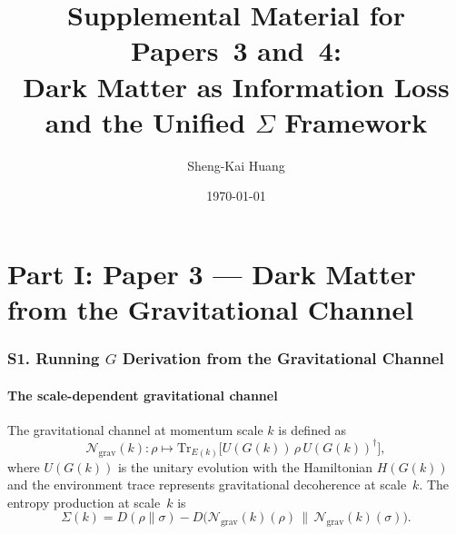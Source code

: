 \documentclass[aps,prd,preprint,superscriptaddress,longbibliography]{revtex4-2}
\newcommand{\Tr}{\mathrm{Tr}}
\newcommand{\chan}{\mathcal{N}}
\newcommand{\KL}{D}
\begin{document}
\title{Supplemental Material for Papers~3 and~4:\\
Dark Matter as Information Loss and the Unified $\Sigma$ Framework}

\author{Sheng-Kai Huang}

\date{\today}

\maketitle

\tableofcontents


\part*{Part I: Paper 3 --- Dark Matter from the Gravitational Channel}

\section{S1. Running $G$ Derivation from the Gravitational Channel}
\label{sec:running_G}

\subsection{The scale-dependent gravitational channel}

The gravitational channel at momentum scale $k$ is defined as
\begin{equation}
\chan_{\mathrm{grav}}(k): \rho \mapsto \Tr_{E(k)}
\big[U(G(k))\,\rho\, U(G(k))^{\dagger}\big],
\label{eq:grav_channel}
\end{equation}
where $U(G(k))$ is the unitary evolution with the Hamiltonian
$H(G(k))$ and the environment trace represents gravitational
decoherence at scale~$k$.  The entropy production at scale~$k$ is
\begin{equation}
\Sigma(k) = \KL(\rho\|\sigma) - \KL\!\big(\chan_{\mathrm{grav}}(k)(\rho)
\,\big\|\,\chan_{\mathrm{grav}}(k)(\sigma)\big).
\label{eq:Sigma_k}
\end{equation}
\end{document}
